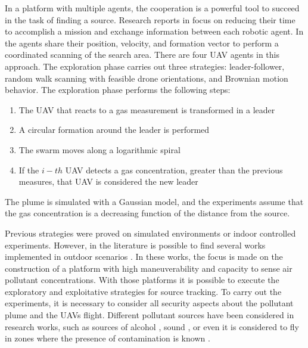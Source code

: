 In a platform with multiple agents, the cooperation is a powerful tool to succeed in the task of finding a source.
Research reports in \cite{facinelli2019cooperative, euler2017optimized, bayat2017environmental, li2017potential} focus on reducing their time to accomplish a mission and exchange information between each robotic agent. 
In \cite{facinelli2019cooperative} the agents share their position, velocity, and formation vector to perform a coordinated scanning of the search area. 
There are four UAV agents in this approach.
The exploration phase carries out three strategies: leader-follower, random walk scanning with feasible drone orientations, and Brownian motion behavior.
The exploration phase performs the following steps:
\begin{enumerate}
    \item The UAV that reacts to a gas measurement is transformed in a leader
    \item A circular formation around the leader is performed
    \item The swarm moves along a logarithmic spiral
    \item If the $i-th$ UAV detects a gas concentration, greater than the previous measures, that UAV is considered the new leader
\end{enumerate}

The plume is simulated with a Gaussian model, and the experiments assume that the gas concentration is a decreasing function of the distance from the source.

Previous strategies were proved on simulated environments or indoor controlled experiments.
However, in the literature is possible to find several works implemented in outdoor scenarios \cite{bayat2017environmental,villa2016development,ya2017uav,yungaicela2017design}. 
In these works, the focus is made on the construction of a platform with high maneuverability and capacity to sense air pollutant concentrations. 
With those platforms it is possible to execute the exploratory and exploitative strategies for source tracking. 
To carry out the experiments, it is necessary to consider all security aspects about the pollutant plume and the UAVs flight. 
Different pollutant sources have been considered in research works, such as sources of alcohol \cite{rossi2015autonomous}, sound \cite{hoshiba2017design}, or even it is considered to fly in zones where the presence of contamination is  known \cite{black2018adaption,yang2018natural,yang2017real}. 

